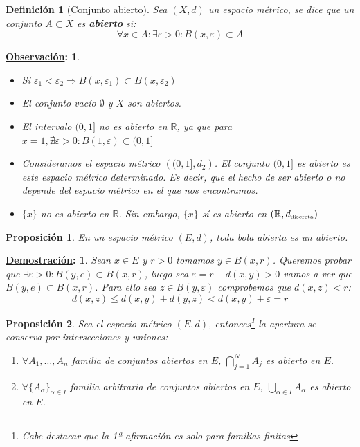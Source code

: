 \documentclass[10pt,a4paper,openright]{book}
\theoremstyle{break}
\newtheorem*{defi}{Definición}
\newtheorem*{prop}{Proposición}
\newtheorem*{demo}{\underline{Demostración}:}
\newtheorem*{obs}{\underline{Observación}:}
\begin{document}
\begin{defi}[Conjunto abierto]
Sea $(X,d)$ un espacio métrico, se dice que un conjunto $A \subset X$ es \textbf{abierto} si:
$$\forall x \in A : \exists \varepsilon > 0 : B(x,\varepsilon) \subset A$$
\end{defi}

\begin{obs}
\begin{itemize}
\item Si $\varepsilon_1 < \varepsilon_2 \Rightarrow B(x,\varepsilon_1) \subset B(x,\varepsilon_2)$

\item El conjunto vacío $\emptyset$ y $X$ son abiertos.

\item El intervalo $(0,1]$ no es abierto en $\mathbb{R}$, ya que para $x=1, \nexists \varepsilon > 0 : B(1,\varepsilon) \subset (0,1]$

\item Consideramos el espacio métrico $\left( (0,1], d_2 \right)$. El conjunto $(0,1]$ es abierto es este espacio métrico determinado. Es decir, que el hecho de ser abierto o no depende del espacio métrico en el que nos encontramos.

\item $\{x\}$ no es abierto en $\mathbb{R}$. Sin embargo, $\{x\}$ sí es abierto en $(\mathbb{R}, d_{\mbox{\tiny discreta}})$
\end{itemize}
\end{obs}


\begin{prop}
En un espacio métrico $(E,d)$, toda bola abierta es un abierto.
\end{prop}

\begin{demo}
Sean $x \in E$ y $r>0$ tomamos $y \in B(x,r)$. Queremos probar que $\exists \varepsilon > 0 : B(y,e) \subset B(x,r)$, luego sea $\varepsilon = r - d(x,y) > 0$ vamos a ver que $B(y,e) \subset B(x,r)$. Para ello sea $z \in B(y, \varepsilon)$ comprobemos que $d(x,z) < r$:
$$d(x,z) \leq d(x,y) + d(y,z) < d(x,y) + \varepsilon = r$$
\end{demo}

\begin{prop}
Sea el espacio métrico $(E,d)$, entonces\footnote{Cabe destacar que la 1ª afirmación es solo para familias finitas} la apertura se conserva por intersecciones y uniones:
\begin{enumerate}
\item $\forall A_1, \ldots, A_n$ familia de conjuntos abiertos en $E$, $\displaystyle\bigcap_{j=1}^N A_j$ es abierto en $E$.

\item $\forall \{A_\alpha\}_{\alpha \in I}$ familia arbitraria de conjuntos abiertos en $E$, $\displaystyle \bigcup_{\alpha \in I} A_\alpha$ es abierto en $E$.
\end{enumerate}
\end{prop}
\end{document}
